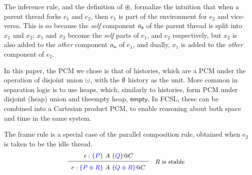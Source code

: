 The inference rule, and the definition of $\circledast$, formalize the
intuition that when a parent thread forks $e_1$ and $e_2$, then $e_1$
is part of the environment for $e_2$ and vice-versa. This is so
because the \emph{self} component $a_{\mathsf{s}}$ of the parent thread is
split into $x_1$ and $x_2$; $x_1$ and $x_2$ become the \emph{self}
parts of $e_1$, and $e_2$ respectively, but $x_2$ is also added to the
\emph{other} component $a_{\mathsf{o}}$ of $e_1$, and dually, $x_1$ is added
to the \emph{other} component of $e_2$.

In this paper, the PCM we chose is that of histories, which are a PCM
under the operation of disjoint union $\hunion$, with the $\emptyset$
history as the unit. More common in separation logic is to use heaps,
which, similarly to histories, form PCM under disjoint (heap) union
and theempty heap, $\mathsf{empty}$. In FCSL, these can be combined
into a Cartesian product PCM, to enable reasoning about both space and
time in the same system.


The frame rule is a special case of the parallel composition rule,
obtained when $e_2$ is taken to be the idle thread.
\[
{\small{
\begin{array}{c}
e : \specK{\{P\}}\ A\ \specK{\{Q\}} @ C\\[2pt]
\hline\\[-7pt]
e : \specK{\{P \circledast R\}}\ A\ \specK{\{Q \circledast R\}} @ C 
\end{array}  \quad \mbox{$R$ is stable} 
}}
\]

